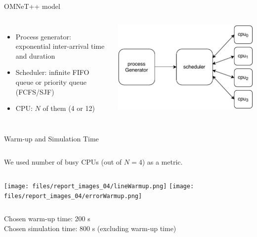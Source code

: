 \documentclass[aspectratio=169,xcolor=dvipsnames]{beamer}
\begin{document}
\begin{frame}{OMNeT++ model}
    \begin{columns}[c] %

    \begin{itemize}
        \item Process generator: exponential inter-arrival time and duration
        \item Scheduler: infinite FIFO queue or priority queue (FCFS/SJF)
        \item CPU: $N$ of them (4 or 12)
    \end{itemize}

    \includegraphics[width=\textwidth]{files/Computer.pdf} %
\end{columns}
    
\end{frame}


\begin{frame}{Warm-up and Simulation Time}
    \begin{columns}[c]
        We used number of busy CPUs (out of $N = 4$) as a metric.
    \end{columns}
    \begin{columns}[c] %
        \texttt{[image: files/report\_images\_04/lineWarmup.png]}
        \texttt{[image: files/report\_images\_04/errorWarmup.png]}
    \end{columns}
    \begin{columns}[c]
        \begin{block}{}
            Chosen warm-up time: 200 s\\
            Chosen simulation time: 800 s (excluding warm-up time)
        \end{block}
    \end{columns}
\end{frame}
\end{document}

